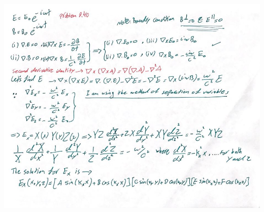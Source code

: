 \documentclass[fleqn]{article}
\begin{document}
\begin{enumerate}
    \pagebreak

    \begin{center}
      \includegraphics[height=14cm, width=16cm]{1.JPG}
    \end{center}
    

  \end{enumerate}
\end{document}

